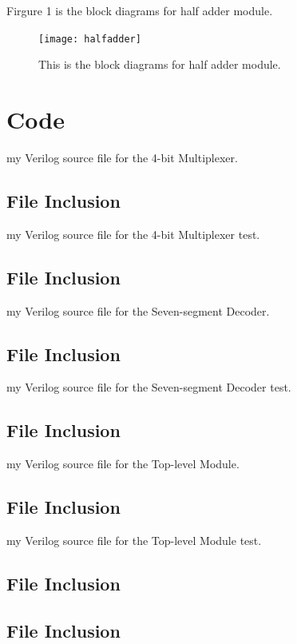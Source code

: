 \documentclass[11pt]{article}
\newcommand{\Verilog}[2][]{%
	
}
\begin{document}
	
	Firgure 1 is the block diagrams for half adder module. \\
	\begin{figure}[ht]\centering    
		\texttt{[image: halfadder]}    
		\caption{This is the block diagrams for half adder module.}    
		\label{fig:halfadder}
	\end{figure}



\section*{Code}

my Verilog source file for the 4-bit Multiplexer.\\
\subsection*{File Inclusion}
\Verilog[caption=4-bit Multiplexer Verilog code,label=code:file_ex]{mux2_4b.sv}
my Verilog source file for the 4-bit Multiplexer test.\\
\subsection*{File Inclusion}
\Verilog[caption=4-bit Multiplexer Test Benches Verilog code,label=code:file_ex]{mux2_4b_test.sv}

my Verilog source file for the Seven-segment Decoder.\\
\subsection*{File Inclusion}
\Verilog[caption=Seven-segment Decoder Verilog code,label=code:file_ex]{sseg_decoder.sv}
my Verilog source file for the Seven-segment Decoder test.\\
\subsection*{File Inclusion}
\Verilog[caption=Seven-segment Decoder Test Benches Verilog code,label=code:file_ex]{sseg_decoder_test.sv}

my Verilog source file for the Top-level Module.\\
\subsection*{File Inclusion}
\Verilog[caption=Top-level Module Verilog code,label=code:file_ex]{sseg1.sv}
my Verilog source file for the Top-level Module test.\\
\subsection*{File Inclusion}
\Verilog[caption=Top-level Module Test Benches Verilog code,label=code:file_ex]{sseg1_test.sv}


\subsection*{File Inclusion}
\Verilog[caption=Two Bit Adder/Aubtractor Verilog code,label=code:file_ex]{sseg1_wrapper.sv}
\end{document}
